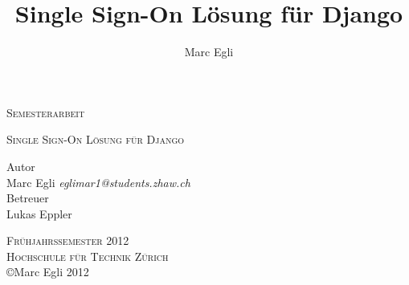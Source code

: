 
\begin{titlepage}
\author{Marc Egli}
\title{Single Sign-On Lösung für Django}
\date{}
\begin{center}

\Large
\textsc{Semesterarbeit}\\



\vspace{0.5cm}
\begin{center}
\end{center}
\textsc{Single Sign-On Lösung für Django}
\vspace{1cm}

\large
Autor\\
Marc Egli \textsl{eglimar1@students.zhaw.ch}\\

\vspace{1cm}
Betreuer\\
Lukas Eppler\\
\vspace{1.0cm}




\textsc{Frühjahrssemester 2012}\\
\textsc{Hochschule für Technik Zürich}\\
\vspace{0.5cm}
\normalsize
\copyright Marc Egli 2012

\end{center}

\end{titlepage}
\newpage